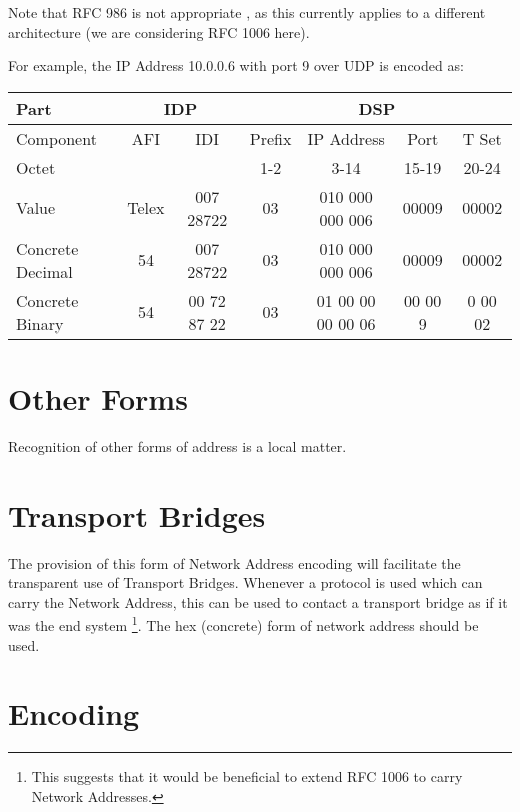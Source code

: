 Note that RFC 986 is not appropriate \cite{RFC-986}, as this currently applies to a
different architecture (we are considering RFC 1006 here).


For example, the IP Address 10.0.0.6 with port 9 over UDP is
encoded as:

\begin {center}
\begin {small}
\begin {tabular}{|l||c|c|c|c|c|c|}
\hline
Part & \multicolumn{2}{c|}{IDP} &  \multicolumn{4}{c|}{DSP} \\
\hline
Component & AFI & IDI & Prefix & IP Address & Port & T Set \\
\hline
Octet & & & 1-2 & 3-14 & 15-19 & 20-24 \\
\hline
Value & Telex & 007 28722 & 03 & 010 000 000 006 & 00009 & 00002 \\
\hline
\hline
Concrete Decimal & 54 & 007 28722 & 03 & 010 000 000 006 & 00009 & 00002 \\
\hline 
Concrete Binary & 54 & 00 72 87 22 & 03 & 01 00 00 00 00 06 & 00 00 9 & 0 00 02 \\
\hline
\end {tabular}
\end {small}
\end {center}


\section {Other Forms}

Recognition of other forms of address is a local matter.

\section {Transport Bridges}

The provision of this form of Network Address encoding will
facilitate the transparent use of Transport Bridges.  Whenever a
protocol is used which can carry the Network Address, this can be
used to contact a transport bridge as if it was the end system
\footnote{This suggests that it would be beneficial to extend RFC
1006 to carry Network Addresses.}.
The hex (concrete) form of network address should be used.

\section {Encoding}

